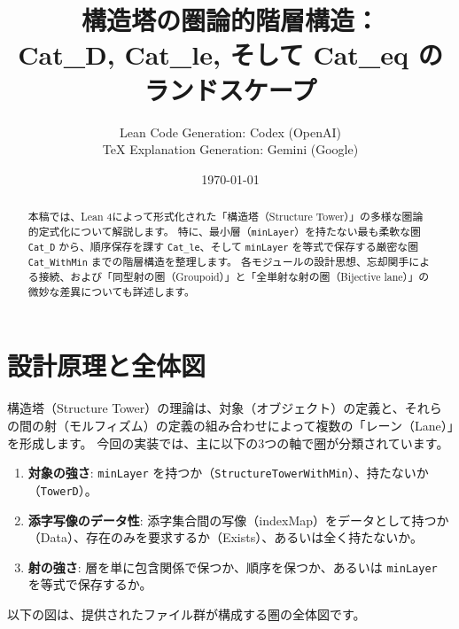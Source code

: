 \documentclass[judge=standard,11pt]{jlreq}
\title{構造塔の圏論的階層構造：\\Cat\_D, Cat\_le, そして Cat\_eq のランドスケープ}
\author{Lean Code Generation: Codex (OpenAI) \\ TeX Explanation Generation: Gemini (Google)}
\date{\today}
\theoremstyle{definition}
\begin{document}
\maketitle

\begin{abstract}
本稿では、Lean 4によって形式化された「構造塔（Structure Tower）」の多様な圏論的定式化について解説します。
特に、最小層（\texttt{minLayer}）を持たない最も柔軟な圏 \texttt{Cat\_D} から、順序保存を課す \texttt{Cat\_le}、そして \texttt{minLayer} を等式で保存する厳密な圏 \texttt{Cat\_WithMin} までの階層構造を整理します。
各モジュールの設計思想、忘却関手による接続、および「同型射の圏（Groupoid）」と「全単射な射の圏（Bijective lane）」の微妙な差異についても詳述します。
\end{abstract}

\tableofcontents

\section{設計原理と全体図}

構造塔（Structure Tower）の理論は、対象（オブジェクト）の定義と、それらの間の射（モルフィズム）の定義の組み合わせによって複数の「レーン（Lane）」を形成します。
今回の実装では、主に以下の3つの軸で圏が分類されています。

\begin{enumerate}
    \item \textbf{対象の強さ}: \texttt{minLayer} を持つか（\texttt{StructureTowerWithMin}）、持たないか（\texttt{TowerD}）。
    \item \textbf{添字写像のデータ性}: 添字集合間の写像（indexMap）をデータとして持つか（Data）、存在のみを要求するか（Exists）、あるいは全く持たないか。
    \item \textbf{射の強さ}: 層を単に包含関係で保つか、順序を保つか、あるいは \texttt{minLayer} を等式で保存するか。
\end{enumerate}

以下の図は、提供されたファイル群が構成する圏の全体図です。
\end{document}
